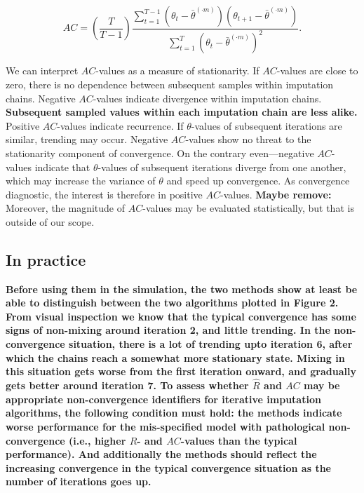 \documentclass[Royal,times,sageh]{sagej}
\begin{document}
\begin{equation*}
AC = \left( \frac{T}{T-1} \right) \frac{\sum_{t=1}^{T-1}(\theta_t - \bar{\theta}^{(\cdot m)})(\theta_{t+1} - \bar{\theta}^{(\cdot m)})}{\sum_{t=1}^{T}(\theta_t - \bar{\theta}^{(\cdot m)})^2}.
\end{equation*}

We can interpret \(AC\)-values as a measure of stationarity. If
\(AC\)-values are close to zero, there is no dependence between
subsequent samples within imputation chains. Negative \(AC\)-values
indicate divergence within imputation chains. \textbf{Subsequent sampled
values within each imputation chain are less alike.} Positive
\(AC\)-values indicate recurrence. If \(\theta\)-values of subsequent
iterations are similar, trending may occur. Negative \(AC\)-values show
no threat to the stationarity component of convergence. On the contrary
even---negative \(AC\)-values indicate that \(\theta\)-values of
subsequent iterations diverge from one another, which may increase the
variance of \(\theta\) and speed up convergence. As convergence
diagnostic, the interest is therefore in positive \(AC\)-values.
\textbf{Maybe remove:} Moreover, the magnitude of \(AC\)-values may be
evaluated statistically, but that is outside of our scope.

\hypertarget{in-practice}{%
\subsection{In practice}\label{in-practice}}

\textbf{Before using them in the simulation, the two methods show at
least be able to distinguish between the two algorithms plotted in
Figure 2. From visual inspection we know that the typical convergence
has some signs of non-mixing around iteration 2, and little trending. In
the non-convergence situation, there is a lot of trending upto iteration
6, after which the chains reach a somewhat more stationary state. Mixing
in this situation gets worse from the first iteration onward, and
gradually gets better around iteration 7. To assess whether
\(\widehat{R}\) and \(AC\) may be appropriate non-convergence
identifiers for iterative imputation algorithms, the following condition
must hold: the methods indicate worse performance for the mis-specified
model with pathological non-convergence (i.e., higher \(\widehat{R}\)-
and \(AC\)-values than the typical performance). And additionally the
methods should reflect the increasing convergence in the typical
convergence situation as the number of iterations goes up.}
\end{document}
